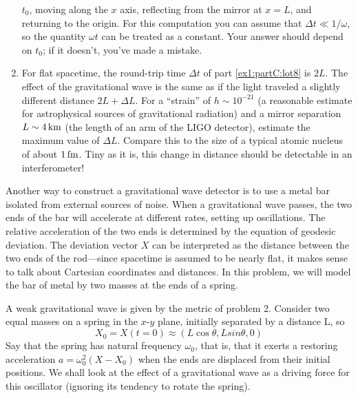 \begin{exercises}
\begin{xca}
\begin{enumerate}
  $t_{0}$, moving along the $x$ axis, reflecting from the mirror
  at $x = L$, and returning to the origin. For this computation
  you can assume that $\Delta t\ll1/\omega$, so the quantity
  $\omega{t}$ can be treated as a constant. Your answer should
  depend on $t_{0}$; if it doesn't, you've made a mistake. 
\item For flat spacetime, the round-trip time $\Delta t$ of part
  \ref{ex1:partC:lot8} is $2L$. The effect of the gravitational
  wave is the same as if the light traveled a slightly different
  distance $2L +\Delta L$. For a ``strain'' of $h\sim 10^{-21}$
  (a reasonable estimate for astrophysical sources of
  gravitational radiation) and a mirror separation $L\sim 4\,{\rm
    km}$ (the length of an arm of the LIGO detector), estimate
  the maximum value of $\Delta{L}$. Compare this to the size of a
  typical atomic nucleus of about $1\,{\rm fm}$. Tiny as it is,
  this change in distance should be detectable in an
  interferometer! 
\end{enumerate}
\end{xca}
\begin{xca}
Another way to construct a gravitational wave detector is to use a metal bar isolated from external sources of noise. When a gravitational wave passes, the two ends of the bar will accelerate at different rates, setting up oscillations. The relative acceleration of the two ends is determined by the equation of geodesic deviation. The deviation vector $X$ can be interpreted as the distance between the two ends of the rod---since spacetime
is assumed to be nearly flat, it makes sense to talk about Cartesian coordinates and
distances. In this problem, we will model the bar of metal by two masses at the ends of
a spring.

A weak gravitational wave is given by the metric of problem 2. Consider two equal masses on a spring in the $x$-$y$ plane, initially separated by a distance L, so
\begin{equation}
X_{0} = X(t = 0) \approx (L \cos \theta, L sin \theta, 0)
\end{equation}
Say that the spring has natural frequency $\omega_{0}$, that is,
that it exerts a restoring acceleration $a = \omega_{0}^{2} (X -
X_{0})$ when the ends are displaced from their initial
positions. We shall look at the effect of a gravitational wave as
a driving force for this oscillator (ignoring its tendency to
rotate the spring). 


\end{xca}
\end{exercises}
